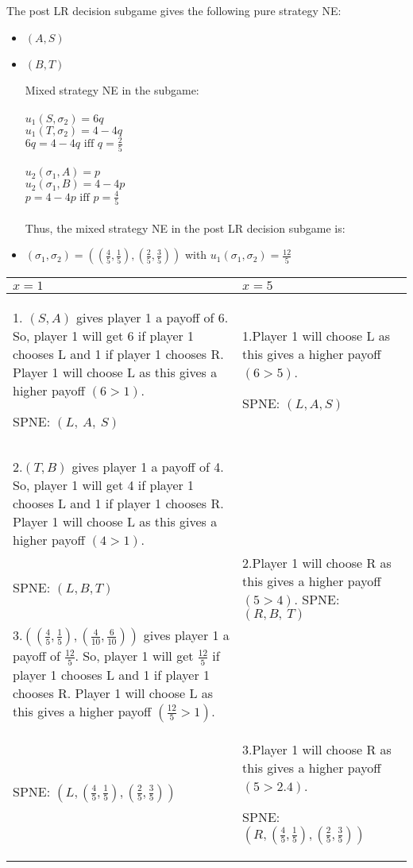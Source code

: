 \documentclass[a4paper]{article}
\begin{document}
The post LR decision subgame gives the following pure strategy NE: 
\begin{itemize}
\item
$(A,S)$ 
\item
$(B,T)$

Mixed strategy NE in the subgame:\\
\\
$u_1(S,\sigma_2)=6q$\\
$u_1(T,\sigma_2)=4-4q$\\
$6q=4-4q \text{ iff } q=\frac{2}{5}$\\
\\
$u_2(\sigma_1,A)=p$\\
$u_2(\sigma_1,B)=4-4p$\\
$p=4-4p \text{ iff }p=\frac{4}{5}$\\
\\
Thus, the mixed strategy NE in the post LR decision subgame is:
\item
$(\sigma_1,\sigma_2)=((\frac{4}{5},\frac{1}{5}),(\frac{2}{5},\frac{3}{5}))$ with $u_1(\sigma_1,\sigma_2)=\frac{12}{5}$\\
\end{itemize}
\begin{center}
\begin{tabular}{  p{18em}  p{18em}  } 
$x=1$ & $x=5$\\
\hline
1. \((S,A)\) gives player 1 a payoff of 6. So, player 1 will get 6 if
player 1 chooses L and 1 if player 1 chooses R. Player 1 will choose L
as this gives a higher payoff \((6 > 1)\).

SPNE: \((L,\ A,\ S)\)&
1.Player 1 will choose L as this gives a higher payoff \((6 > 5)\).

SPNE: \(\left( L ,A ,S \right)\)\\ \\ \\
\hline
2.\((T,B)\) gives player 1 a payoff of 4. So, player 1 will get 4 if
player 1 chooses L and 1 if player 1 chooses R. Player 1 will choose L
as this gives a higher payoff \((4 > 1)\).\\SPNE: \((L,B,T)\) & 
2.Player 1 will choose R as this gives a higher payoff \((5 > 4)\). 
SPNE: \((R,B,\ T)\)\\
\hline
3.\(\left( \left( \frac{4}{5},\frac{1}{5} \right),\left( \frac{4}{10},\frac{6}{10} \right) \right)\)
gives player 1 a payoff of \(\frac{12}{5}\). So, player 1 will get
\(\frac{12}{5}\) if player 1 chooses L and 1 if player 1 chooses R.
Player 1 will choose L as this gives a higher payoff
\((\frac{12}{5} > 1)\).
\\
SPNE:
\((L,\left( \frac{4}{5},\frac{1}{5} \right),(\frac{2}{5},\frac{3}{5}))\)&

3.Player 1 will choose R as this gives a higher payoff \((5 > 2.4)\).

SPNE:
\((R,\left( \frac{4}{5},\frac{1}{5} \right),\left( \frac{2}{5},\frac{3}{5} \right))\)\\
\end{tabular}
\end{center}
\end{document}
